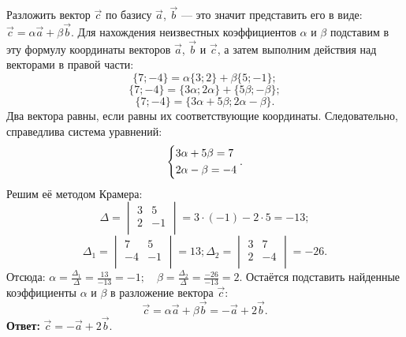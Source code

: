 \documentclass[10pt]{article}
\numberwithin{primer}{section}
\numberwithin{equation}{section}
\begin{document}
Разложить вектор  $\vec{c}$ по базису $\vec{a}$, $\vec{b}$ --- это значит представить его в виде: $\vec{c}=\alpha\vec{a}+\beta\vec{b}$. Для нахождения неизвестных коэффициентов $\alpha$ и $\beta$ подставим в эту формулу координаты векторов $\vec{a}$, $\vec{b}$ и $\vec{c}$, а затем выполним действия над векторами в правой части:
\begin{equation*}
\{7;-4\}=\alpha\{3;2\}+\beta\{5;-1\};
\end{equation*}
\begin{equation*}
\{7;-4\}=\{3\alpha;2\alpha\}+\{5\beta;-\beta\};
\end{equation*}
\begin{equation*}
\{7;-4\}=\{3\alpha+5\beta;2\alpha-\beta\}.
\end{equation*}
Два вектора равны, если равны их соответствующие координаты. Следовательно, справедлива система уравнений:
\begin{equation*}
\left\{ \begin{gathered}
3\alpha+5\beta = 7 \hfill \\
2\alpha-\beta = -4 \hfill \\
\end{gathered}  \right..
\end{equation*}
Решим её методом Крамера:
\begin{equation*}
\Delta = \begin{vmatrix}
3 & 5 \\
2 & -1 \\
\end{vmatrix}=3\cdot(-1)-2\cdot5=-13;
\end{equation*}
\begin{equation*}
\Delta_1 = \begin{vmatrix}
7 & 5 \\
-4 & -1 \\
\end{vmatrix}=13;\Delta_2 = \begin{vmatrix}
3 & 7 \\
2 & -4 \\
\end{vmatrix}=-26.
\end{equation*}
Отсюда:
$
\alpha = \frac{\Delta_1}{\Delta}=\frac{13}{-13}=-1;\quad\beta=\frac{\Delta_2}{\Delta}=\frac{-26}{-13}=2.
$
Остаётся подставить найденные коэффициенты $\alpha$ и $\beta$ в разложение вектора $\vec{c}$: \[\vec{c}=\alpha\vec{a}+\beta\vec{b}=-\vec{a}+2\vec{b}.\]
\noindent\textbf{Ответ: }$\vec{c}=-\vec{a}+2\vec{b}$.\vspace{4pt}
\end{document}
